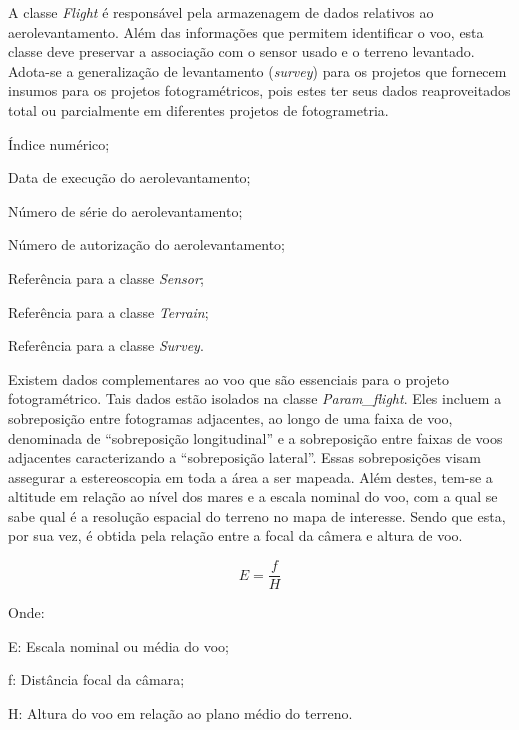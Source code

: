 A classe \textit{Flight} é responsável pela armazenagem de dados relativos ao aerolevantamento. Além das informações que permitem identificar o voo, esta classe deve preservar a associação com o sensor usado e o terreno levantado. Adota-se a generalização de levantamento (\textit{survey}) para os projetos que fornecem insumos para os projetos fotogramétricos, pois estes ter seus dados reaproveitados total ou parcialmente em diferentes projetos de fotogrametria.

\begin{description}[labelwidth=2cm, itemsep=-0.3cm]
\item [Classe Flight]
\item[Id:] Índice numérico;
\item[Date:] Data de execução do aerolevantamento;
\item[Num\_ser:] Número de série do aerolevantamento;
\item[Num\_auth:] Número de autorização do aerolevantamento;
\item[Id\_sensor:] Referência para a classe \textit{Sensor};
\item[Id\_terrain:] Referência para a classe \textit{Terrain};
\item[Id\_survey:] Referência para a classe \textit{Survey}.
\end{description}

Existem dados complementares ao voo que são essenciais para o projeto fotogramétrico. Tais dados estão isolados na classe \textit{Param\_flight}.
Eles incluem a sobreposição entre fotogramas adjacentes, ao longo de uma faixa de voo, denominada de ``sobreposição longitudinal'' e a sobreposição entre faixas de voos adjacentes caracterizando a ``sobreposição lateral''. Essas sobreposições visam assegurar a estereoscopia em toda a área a ser mapeada.
Além destes, tem-se a altitude em relação ao nível dos mares e a escala nominal do voo, com a qual se sabe qual é a resolução espacial do terreno no mapa de interesse. Sendo que esta, por sua vez, é obtida pela relação entre a focal da câmera e altura de voo.

\begin{equation} \label{escala}
   E = \frac{f}{H}
\end{equation}

Onde:

E: Escala nominal ou média do voo;

f: Distância focal da câmara;

H: Altura do voo em relação ao plano médio do terreno.


